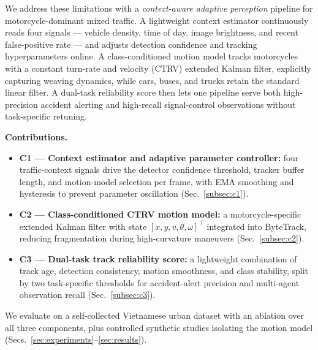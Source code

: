 We address these limitations with a \emph{context-aware adaptive
perception} pipeline for motorcycle-dominant mixed traffic.
A lightweight context estimator continuously reads four signals ---
vehicle density, time of day, image brightness, and recent
false-positive rate --- and adjusts detection confidence and tracking
hyperparameters online.
A class-conditioned motion model tracks motorcycles with a constant
turn-rate and velocity (CTRV) extended Kalman filter, explicitly
capturing weaving dynamics, while cars, buses, and trucks retain the
standard linear filter.
A dual-task reliability score then lets one pipeline serve both
high-precision accident alerting and high-recall signal-control
observations without task-specific retuning.

\noindent\textbf{Contributions.}
\begin{itemize}
  \item \textbf{C1 --- Context estimator and adaptive parameter
        controller:} four traffic-context signals drive the detector
        confidence threshold, tracker buffer length, and motion-model
        selection per frame, with EMA smoothing and hysteresis to
        prevent parameter oscillation (Sec.~\ref{subsec:c1}).
  \item \textbf{C2 --- Class-conditioned CTRV motion model:} a
        motorcycle-specific extended Kalman filter with state
        $[x, y, v, \theta, \omega]^\top$ integrated into ByteTrack,
        reducing fragmentation during high-curvature maneuvers
        (Sec.~\ref{subsec:c2}).
  \item \textbf{C3 --- Dual-task track reliability score:} a
        lightweight combination of track age, detection consistency,
        motion smoothness, and class stability, split by two
        task-specific thresholds for accident-alert precision and
        multi-agent observation recall (Sec.~\ref{subsec:c3}).
\end{itemize}

We evaluate on a self-collected Vietnamese urban dataset with an
ablation over all three components, plus controlled synthetic studies
isolating the motion model
(Secs.~\ref{sec:experiments}--\ref{sec:results}).
